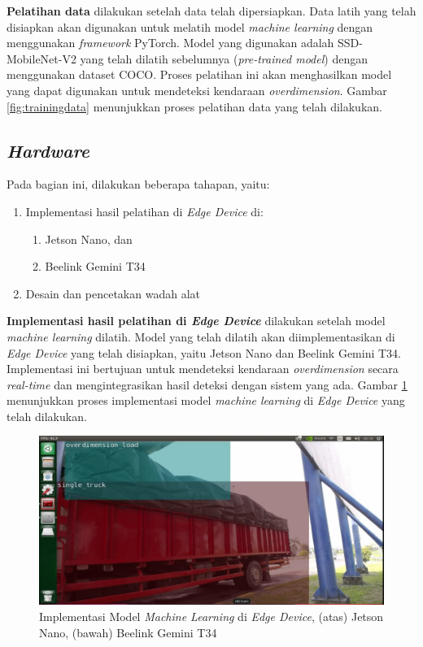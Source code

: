 \textbf{Pelatihan data} dilakukan setelah data telah dipersiapkan. Data latih yang telah disiapkan akan digunakan untuk melatih model \emph{machine learning} dengan menggunakan \emph{framework} PyTorch. Model yang digunakan adalah SSD-MobileNet-V2 yang telah dilatih sebelumnya (\emph{pre-trained model}) dengan menggunakan dataset COCO. Proses pelatihan ini akan menghasilkan model yang dapat digunakan untuk mendeteksi kendaraan \emph{overdimension}. Gambar \ref{fig:trainingdata} menunjukkan proses pelatihan data yang telah dilakukan.

\subsection{\emph{Hardware}}

Pada bagian ini, dilakukan beberapa tahapan, yaitu:
\begin{enumerate}[nolistsep]
  \item Implementasi hasil pelatihan di \emph{Edge Device} di:
  \begin{enumerate}[nolistsep]
    \item Jetson Nano, dan
    \item Beelink Gemini T34
  \end{enumerate} 
  \item Desain dan pencetakan wadah alat
\end{enumerate}

\textbf{Implementasi hasil pelatihan di \emph{Edge Device}} dilakukan setelah model \emph{machine learning} dilatih. Model yang telah dilatih akan diimplementasikan di \emph{Edge Device} yang telah disiapkan, yaitu Jetson Nano dan Beelink Gemini T34. Implementasi ini bertujuan untuk mendeteksi kendaraan \emph{overdimension} secara \emph{real-time} dan mengintegrasikan hasil deteksi dengan sistem yang ada. Gambar \ref{fig:implementationedgedevice} menunjukkan proses implementasi model \emph{machine learning} di \emph{Edge Device} yang telah dilakukan.

\begin{figure}
  \centering

  \includegraphics[scale=0.27]{gambar/bab3-implemetasi-di-jetson.png}

  \caption{\centering Implementasi Model \emph{Machine Learning} di \emph{Edge Device}, (atas) Jetson Nano, (bawah) Beelink Gemini T34}
  \label{fig:implementationedgedevice}
\end{figure}

